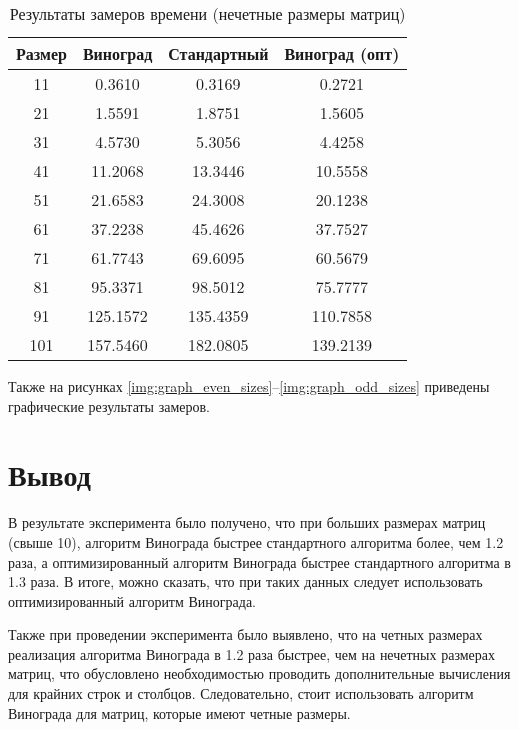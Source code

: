 \begin{table}[h]
    \begin{center}
        \begin{threeparttable}
        \captionsetup{justification=raggedright,singlelinecheck=off}
        \caption{Результаты замеров времени (нечетные размеры матриц)}
        \label{tbl:time_mes_odd}
        \begin{tabular}{|c|c|c|c|}
            \hline
            Размер & Виноград & Стандартный & Виноград (опт) \\
            \hline
            11 & 0.3610 & 0.3169 & 0.2721 \\
            \hline
            21 & 1.5591 & 1.8751 & 1.5605 \\
            \hline
            31 & 4.5730 & 5.3056 & 4.4258 \\
            \hline
            41 & 11.2068 & 13.3446 & 10.5558 \\
            \hline
            51 & 21.6583 & 24.3008 & 20.1238 \\
            \hline
            61 & 37.2238 & 45.4626 & 37.7527 \\
            \hline
            71 & 61.7743 & 69.6095 & 60.5679 \\
            \hline
            81 & 95.3371 & 98.5012 & 75.7777 \\
            \hline
            91 & 125.1572 & 135.4359 & 110.7858 \\
            \hline
            101 & 157.5460 & 182.0805 & 139.2139 \\
            \hline
		\end{tabular}
    \end{threeparttable}
\end{center}
\end{table}

Также на рисунках \ref{img:graph_even_sizes}--\ref{img:graph_odd_sizes} приведены графические результаты замеров.

\clearpage


\section{Вывод}

В результате эксперимента было получено, что при больших размерах матриц (свыше 10), алгоритм Винограда быстрее стандартного алгоритма более, чем 1.2 раза, а оптимизированный алгоритм Винограда быстрее стандартного алгоритма в 1.3 раза. В итоге, можно сказать, что при таких данных следует использовать оптимизированный алгоритм Винограда.

Также при проведении эксперимента было выявлено, что на четных размерах реализация алгоритма Винограда в 1.2 раза быстрее, чем на нечетных размерах матриц, что обусловлено необходимостью проводить дополнительные вычисления для крайних строк и столбцов.  Следовательно, стоит использовать алгоритм Винограда для матриц, которые имеют четные размеры.
